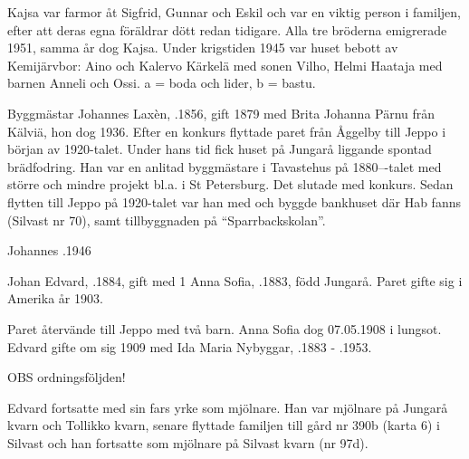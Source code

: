Kajsa var farmor åt Sigfrid, Gunnar och Eskil och var en viktig person i familjen, efter att deras egna föräldrar dött redan tidigare. Alla tre bröderna emigrerade 1951, samma år dog Kajsa. Under 	krigstiden 1945 var huset bebott av Kemijärvbor: Aino och Kalervo Kärkelä med sonen Vilho, Helmi Haataja med barnen Anneli och Ossi. a = boda och lider, b = bastu.


Byggmästar Johannes Laxèn, .1856, gift 1879 med Brita Johanna Pärnu från Kälviä, hon dog 1936. Efter en konkurs flyttade paret från Åggelby till Jeppo i början av 1920-talet. Under hans tid fick huset på Jungarå liggande spontad brädfodring. Han var en anlitad byggmästare i Tavastehus på 1880---talet med större och mindre projekt bl.a. i St Petersburg. Det slutade med konkurs. Sedan flytten till Jeppo på 1920-talet var han med och byggde bankhuset där Hab fanns (Silvast nr 70), samt tillbyggnaden på ``Sparrbackskolan''.

Johannes .1946


Johan Edvard, .1884, gift med 1 Anna Sofia, .1883, född Jungarå. Paret gifte sig i Amerika år 1903.
\begin{jhchildren}
  \item {}
  \item {}
  \item {}
\end{jhchildren}
Paret återvände till Jeppo med två barn. Anna Sofia dog 07.05.1908 i lungsot. Edvard gifte om sig 1909 med Ida Maria Nybyggar, .1883  -	.1953.
\begin{jhchildren}
  \item {}
  \item {}
  \item {}  OBS ordningsföljden!
\end{jhchildren}
Edvard fortsatte med sin fars yrke som mjölnare. Han var mjölnare på Jungarå kvarn och Tollikko kvarn, senare flyttade familjen till gård nr 390b (karta 6) i Silvast och han fortsatte som mjölnare på Silvast kvarn (nr 97d).

